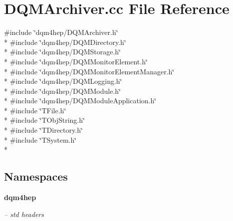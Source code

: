 \section{D\+Q\+M\+Archiver.\+cc File Reference}
\label{DQMArchiver_8cc}
{\ttfamily \#include \char`\"{}dqm4hep/\+D\+Q\+M\+Archiver.\+h\char`\"{}}\\*
{\ttfamily \#include \char`\"{}dqm4hep/\+D\+Q\+M\+Directory.\+h\char`\"{}}\\*
{\ttfamily \#include \char`\"{}dqm4hep/\+D\+Q\+M\+Storage.\+h\char`\"{}}\\*
{\ttfamily \#include \char`\"{}dqm4hep/\+D\+Q\+M\+Monitor\+Element.\+h\char`\"{}}\\*
{\ttfamily \#include \char`\"{}dqm4hep/\+D\+Q\+M\+Monitor\+Element\+Manager.\+h\char`\"{}}\\*
{\ttfamily \#include \char`\"{}dqm4hep/\+D\+Q\+M\+Logging.\+h\char`\"{}}\\*
{\ttfamily \#include \char`\"{}dqm4hep/\+D\+Q\+M\+Module.\+h\char`\"{}}\\*
{\ttfamily \#include \char`\"{}dqm4hep/\+D\+Q\+M\+Module\+Application.\+h\char`\"{}}\\*
{\ttfamily \#include \char`\"{}T\+File.\+h\char`\"{}}\\*
{\ttfamily \#include \char`\"{}T\+Obj\+String.\+h\char`\"{}}\\*
{\ttfamily \#include \char`\"{}T\+Directory.\+h\char`\"{}}\\*
{\ttfamily \#include \char`\"{}T\+System.\+h\char`\"{}}\\*
\subsection*{Namespaces}
\begin{DoxyCompactItemize}
\item 
 {\bf dqm4hep}
\begin{DoxyCompactList}\small\item\em -- std headers \end{DoxyCompactList}\end{DoxyCompactItemize}
